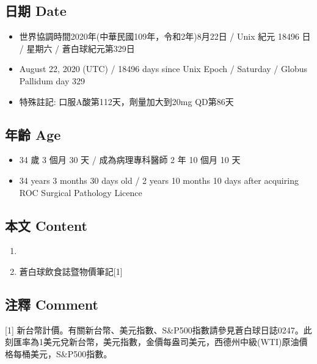 \documentclass[
]{article}
\providecommand{\tightlist}{%
  \setlength{\itemsep}{0pt}\setlength{\parskip}{0pt}}
\begin{document}
\hypertarget{ux65e5ux671f-date-21}{%
\subsection{日期 Date}\label{ux65e5ux671f-date-21}}

\begin{itemize}
\tightlist
\item
  世界協調時間2020年(中華民國109年，令和2年)8月22日 / Unix 紀元 18496 日
  / 星期六 / 蒼白球紀元第329日
\item
  August 22, 2020 (UTC) / 18496 days since Unix Epoch / Saturday /
  Globus Pallidum day 329
\item
  特殊註記: 口服A酸第112天，劑量加大到20mg QD第86天
\end{itemize}

\hypertarget{ux5e74ux9f61-age-21}{%
\subsection{年齡 Age}\label{ux5e74ux9f61-age-21}}

\begin{itemize}
\tightlist
\item
  34 歲 3 個月 30 天 / 成為病理專科醫師 2 年 10 個月 10 天
\item
  34 years 3 months 30 days old / 2 years 10 months 10 days after
  acquiring ROC Surgical Pathology Licence
\end{itemize}

\hypertarget{ux672cux6587-content-21}{%
\subsection{本文 Content}\label{ux672cux6587-content-21}}

\begin{enumerate}
\def\labelenumi{\arabic{enumi}.}
\tightlist
\item
\item
  蒼白球飲食誌暨物價筆記{[}1{]}
\end{enumerate}

\hypertarget{ux6ce8ux91cb-comment-21}{%
\subsection{注釋 Comment}\label{ux6ce8ux91cb-comment-21}}

{[}1{]}
新台幣計價。有關新台幣、美元指數、S\&P500指數請參見蒼白球日誌0247。此刻匯率為1美元兌新台幣，美元指數，金價每盎司美元，西德州中級(WTI)原油價格每桶美元，S\&P500指數。
\end{document}
